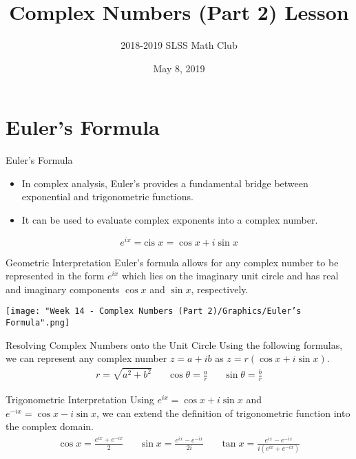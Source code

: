 \documentclass{beamer}
\title{Complex Numbers (Part 2) Lesson}
\author{2018-2019 SLSS Math Club}
\date{May 8, 2019}
\begin{document}
\frame{\titlepage}

\section{Euler's Formula}
\begin{frame}{Euler's Formula}
\begin{itemize}
    \item In complex analysis, Euler's provides a fundamental bridge between exponential and trigonometric functions. 
    \item It can be used to evaluate complex exponents into a complex number.
\end{itemize}

\begin{equation*}
    e^{ix} = \text{cis } x = \cos{x} + i\sin{x}
\end{equation*}
\end{frame}

\begin{frame}{Geometric Interpretation}
Euler's formula allows for any complex number to be represented in the form $e^{ix}$ which lies on the imaginary unit circle and has real and imaginary components $\cos{x}$ and $\sin{x}$, respectively.

\begin{center}
    \texttt{[image: "Week 14 - Complex Numbers (Part 2)/Graphics/Euler's Formula".png]}
\end{center}
\end{frame}

\begin{frame}{Resolving Complex Numbers onto the Unit Circle}
Using the following formulas, we can represent any complex number $z = a + ib$ as $z = r(\cos{x} + i\sin{x})$.
\begin{align*}
    r = \sqrt{a^2 + b^2} && \cos{\theta} = \frac{a}{r} && \sin{\theta} = \frac{b}{r}
\end{align*}
\end{frame}

\begin{frame}{Trigonometric Interpretation}
Using $e^{ix} =  \cos{x} + i\sin{x}$ and $e^{-ix} =  \cos{x} - i\sin{x}$, we can extend the definition of trigonometric function into the complex domain.
\begin{align*}
    \cos{x} = \frac{e^{ix} +e^{-ix}}{2} && \sin{x} = \frac{e^{ix} - e^{-ix}}{2i} && \tan{x} = \frac{e^{ix} - e^{-ix}}{i(e^{ix} +e^{-ix})}
\end{align*}
\end{frame}
\end{document}
